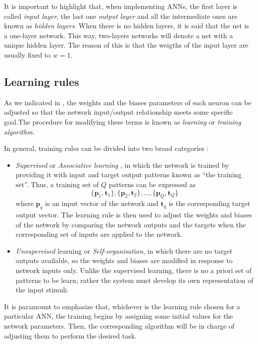 It is important to highlight that, when implementing ANNs, the first layer is called \emph{input layer}, the last one \emph{output layer} and all the intermediate ones are known as \emph{hidden layers}. When there is no hidden layers, it is said that the net is a one-layer network. This way, two-layers networks will denote a net with a unique hidden layer. The reason of this is that the weigths of the input layer are usually fixed to $w=1$.




\subsection{Learning rules}
\label{subsec:learningrules}

As we indicated in , the weights and the biases parameters of each neuron can be adjusted so that the network input/output relationship meets some specific goal.The procedure for modifying these terms is known as \emph{learning} or \emph{training algorithm}. 

In general, training rules can be divided into two broad categories \cite{demuth2008neural}:
\begin{itemize}
\item \emph{Supervised} or \emph{Associative learning}
, in which the network is trained by providing it with input and target output patterns known as ``the training set''. Thus, a training set of $Q$ patterns can be expressed as
\begin{equation}
\{\mathbf{p}_1,\mathbf{t}_1\},\{\mathbf{p}_2,\mathbf{t}_2\}, ... , \{\mathbf{p}_Q,\mathbf{t}_Q\}
\end{equation}
where $\mathbf{p}_q$ is an input vector of the network and $\mathbf{t}_q$ is the corresponding target output vector.
The learning rule is then used to adjust the weights and biases of the network by comparing the network outputs and the targets when the corresponding set of inputs are applied to the network.
\item \emph{Unsupervised} learning or \emph{Self-organisation}, in which there are no target outputs available, so the weights and biases are modified in response to network inputs only. 
Unlike the supervised learning, there is no a priori set of patterns to be learn;
rather the system must develop its own representation of the input stimuli.
\end{itemize}

It is paramount to emphasize that, whichever is the learning rule chosen for 
a particular ANN, the training begins by assigning some initial values for the network parameters. Then, the corresponding algorithm will be in charge of adjusting them to perform the desired task.

